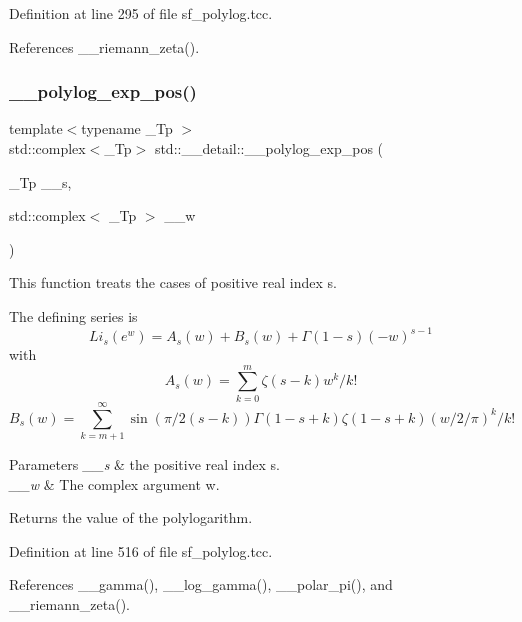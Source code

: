 Definition at line 295 of file sf\+\_\+polylog.\+tcc.



References \+\_\+\+\_\+riemann\+\_\+zeta().

\mbox{\label{namespacestd_1_1____detail_a56b0f5bc6f4955469fd5f83105cbd466}} 
\subsubsection{\texorpdfstring{\+\_\+\+\_\+polylog\+\_\+exp\+\_\+pos()}{\_\_polylog\_exp\_pos()}\hspace{0.1cm}{\footnotesize\ttfamily [3/3]}}
{\footnotesize\ttfamily template$<$typename \+\_\+\+Tp $>$ \\
std\+::complex$<$\+\_\+\+Tp$>$ std\+::\+\_\+\+\_\+detail\+::\+\_\+\+\_\+polylog\+\_\+exp\+\_\+pos (\begin{DoxyParamCaption}\item[{\+\_\+\+Tp}]{\+\_\+\+\_\+s,  }\item[{std\+::complex$<$ \+\_\+\+Tp $>$}]{\+\_\+\+\_\+w }\end{DoxyParamCaption})}

This function treats the cases of positive real index s.

The defining series is \[ Li_s(e^w) = A_s(w) + B_s(w) + \Gamma(1-s)(-w)^{s-1} \] with \[ A_s(w) = \sum_{k=0}^{m} \zeta(s-k)w^k/k! \] \[ B_s(w) = \sum_{k=m+1}^{\infty} \sin(\pi/2(s-k)) \Gamma(1-s+k)\zeta(1-s+k) (w/2/\pi)^k/k! \]


\begin{DoxyParams}{Parameters}
{\em \+\_\+\+\_\+s} & the positive real index s. \\
\hline
{\em \+\_\+\+\_\+w} & The complex argument w. \\
\hline
\end{DoxyParams}
\begin{DoxyReturn}{Returns}
the value of the polylogarithm. 
\end{DoxyReturn}


Definition at line 516 of file sf\+\_\+polylog.\+tcc.



References \+\_\+\+\_\+gamma(), \+\_\+\+\_\+log\+\_\+gamma(), \+\_\+\+\_\+polar\+\_\+pi(), and \+\_\+\+\_\+riemann\+\_\+zeta().

